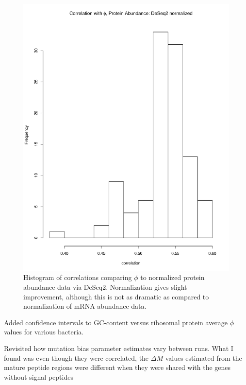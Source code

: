 \documentclass[11pt]{labbook}
\begin{document}
\begin{figure}[H]
\centering
\includegraphics[page=1,scale=0.6]{Ecoli_REL606/correlation_ppr_protein_sf_norm.pdf}
\caption{Histogram of correlations comparing $\phi$ to normalized protein abundance data via DeSeq2. Normalization gives slight improvement, although this is not as dramatic as compared to normalization of mRNA abundance data.}
\end{figure}


Added confidence intervals to GC-content versus ribosomal protein average $\phi$ values for various bacteria. 



Revisited how mutation bias parameter estimates vary between runs. What I found was even though they were correlated, the $\Delta\mathit{M}$ values estimated from the mature peptide regions were different when they were shared with the genes without signal peptides 
\end{document}
